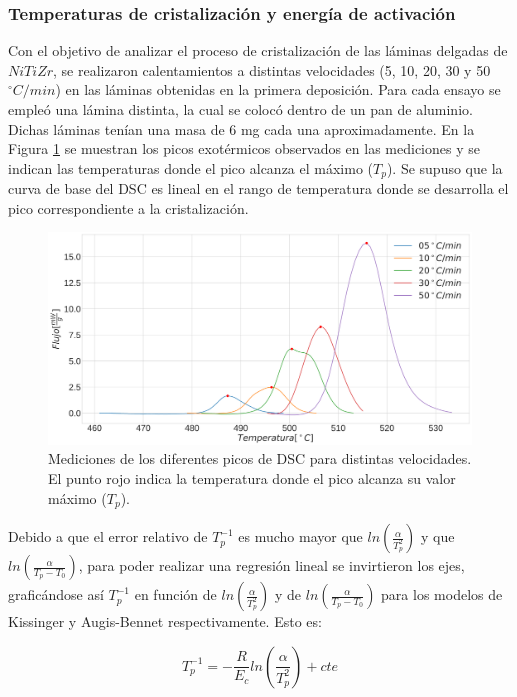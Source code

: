 \documentclass[12pt]{article}
\theoremstyle{definition}
\theoremstyle{remark}
\begin{document}
{\subsubsection{Temperaturas de cristalización y energía de activación}

Con el objetivo de analizar el proceso de cristalización de las láminas delgadas de $NiTiZr$, se realizaron calentamientos a distintas velocidades (5, 10, 20, 30 y 50 $^{\circ} C/min$) en las láminas obtenidas en la primera deposición. Para cada ensayo se empleó una lámina distinta, la cual se colocó dentro de un pan de aluminio. Dichas láminas tenían una masa de 6 mg cada una aproximadamente. En la Figura \ref{DSCPeaks} se muestran los picos exotérmicos observados en las mediciones y se indican las temperaturas donde el pico alcanza el máximo ($T_p$). Se supuso que la curva de base del DSC es lineal en el rango de temperatura donde se desarrolla el pico correspondiente a la cristalización.

\begin{figure}[H]
	\centering
	\includegraphics[scale=0.2]{img/DSCPeaks}
	\caption{Mediciones de los diferentes picos de DSC para distintas velocidades. El punto rojo indica la temperatura donde el pico alcanza su valor máximo ($T_p$).}
	\label{DSCPeaks}
\end{figure}

Debido a que el error relativo de $T_p^{-1}$ es mucho mayor que $ln(\frac{\alpha}{T_p^2})$ y que $ln(\frac{\alpha}{T_p-T_0})$, para poder realizar una regresión lineal se invirtieron los ejes, graficándose así $T_p^{-1}$ en función de $ln(\frac{\alpha}{T_p^2})$ y de $ln(\frac{\alpha}{T_p-T_0})$ para los modelos de Kissinger y Augis-Bennet respectivamente. Esto es:

\begin{equation}
\label{EquationKissinger}
	T_p^{-1}=-\frac{R}{E_c}ln(\frac{\alpha}{T_p^2})+cte
\end{equation}

}
\end{document}
